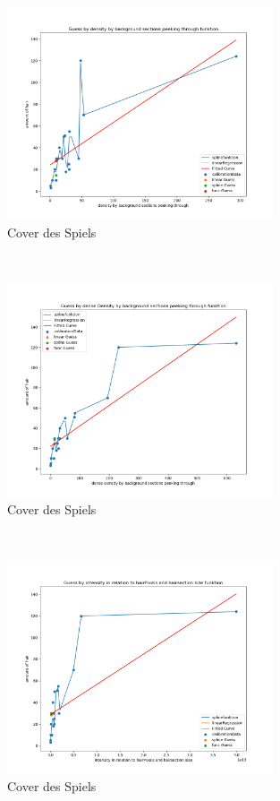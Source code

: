 \documentclass[german,a4paper,12pt,smallheadings,headsepline, titlepage, liststotoc, idextotoc,bibtoctoc,blibliography = totocnumbered]{scrartcl}
\begin{document}
\begin{figure}
	\centering
	\includegraphics[width=0.7\textwidth]{figBina/g6.png}
	\caption[]{Cover des Spiels}
	\label{img:Bina01}
\end{figure}\\
\begin{figure}
	\centering
	\includegraphics[width=0.7\textwidth]{figBina/g7.png}
	\caption[]{Cover des Spiels}
	\label{img:Bina01}
\end{figure}\\
\begin{figure}
	\centering
	\includegraphics[width=0.7\textwidth]{figBina/g8.png}
	\caption[]{Cover des Spiels}
	\label{img:Bina01}
\end{figure}\\
\end{document}
